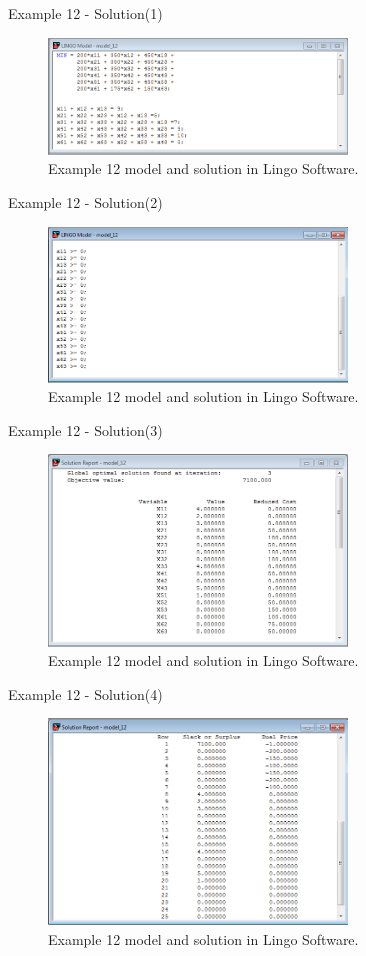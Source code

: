 \begin{frame}{Example 12 - Solution(1)}
\begin{figure}
    \includegraphics[width=300px]{slides/ex12/screenshot_a.png}
    \caption{Example 12 model and solution in Lingo Software.}
\end{figure}
\end{frame}

\begin{frame}{Example 12 - Solution(2)}
\begin{figure}
    \includegraphics[width=300px]{slides/ex12/screenshot_b.png}
    \caption{Example 12 model and solution in Lingo Software.}
\end{figure}
\end{frame}

\begin{frame}{Example 12 - Solution(3)}
\begin{figure}
    \includegraphics[width=300px]{slides/ex12/screenshot_c.png}
    \caption{Example 12 model and solution in Lingo Software.}
\end{figure}
\end{frame}

\begin{frame}{Example 12 - Solution(4)}
\begin{figure}
    \includegraphics[width=300px]{slides/ex12/screenshot_d.png}
    \caption{Example 12 model and solution in Lingo Software.}
\end{figure}
\end{frame}

